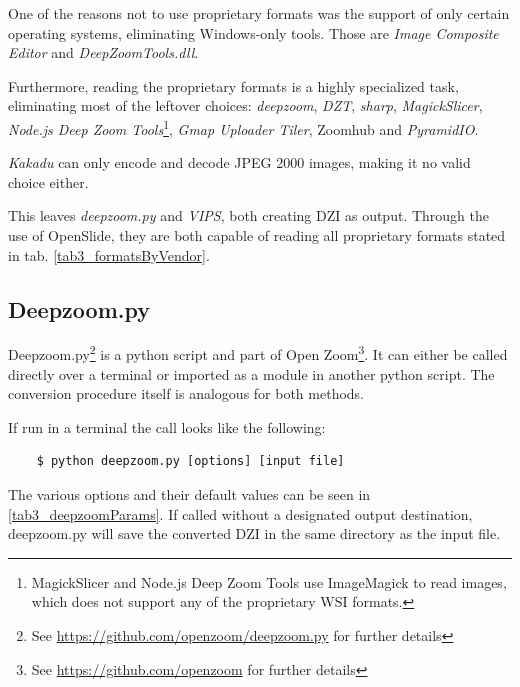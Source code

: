 One of the reasons not to use proprietary formats was the support of only certain operating systems, eliminating Windows-only tools. Those are \emph{Image Composite Editor} and \emph{DeepZoomTools.dll}.

Furthermore, reading the proprietary formats is a highly specialized task, eliminating most of the leftover choices: \emph{deepzoom}\cite{web:deepzoom}, \emph{DZT}\cite{web:dzt}, \emph{sharp}\cite{web:sharp}, \emph{MagickSlicer}, \emph{Node.js Deep Zoom Tools}\footnote{MagickSlicer and Node.js Deep Zoom Tools use ImageMagick to read images, which does not support any of the proprietary WSI formats\cite{web:imagemagick}.}, \emph{Gmap Uploader Tiler}\cite{web:gmap}, Zoomhub\cite{web:zoomhub} and \emph{PyramidIO}\cite{web:pyramidio}.

\emph{Kakadu} can only encode and decode JPEG 2000 images\cite{web:openseadragon}, making it no valid choice either.

This leaves \emph{deepzoom.py} and \emph{VIPS}, both creating DZI as output. Through the use of OpenSlide, they are both capable of reading all proprietary formats stated in tab. \ref{tab3_formatsByVendor}\cite{web:openslide}.


\subsection{Deepzoom.py}

Deepzoom.py\footnote{See \url{https://github.com/openzoom/deepzoom.py} for further details} is a python script and part of Open Zoom\footnote{See \url{https://github.com/openzoom} for further details}. It can either be called directly over a terminal or imported as a module in another python script. The conversion procedure itself is analogous for both methods.

If run in a terminal the call looks like the following:

\begin{lstlisting}
	$ python deepzoom.py [options] [input file]
\end{lstlisting}

The various options and their default values can be seen in \ref{tab3_deepzoomParams}. If called without a designated output destination, deepzoom.py will save the converted DZI in the same directory as the input file.

